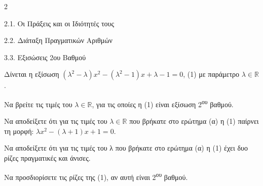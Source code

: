 \begin{ylh}{2}
    \item 2.1. Οι Πράξεις και οι Ιδιότητές τους
    \item 2.2. Διάταξη Πραγματικών Αριθμών
    \item 3.3. Εξισώσεις 2ου Βαθμού
\end{ylh}
Δίνεται η εξίσωση $(\lambda^2 - \lambda)x^2 - (\lambda^2 - 1)x + \lambda - 1 = 0$, (1) με παράμετρο $\lambda \in \mathbb{R}$.

\begin{alist}
\item Να βρείτε τις τιμές του $\lambda \in \mathbb{R}$, για τις οποίες η (1) είναι εξίσωση 2\textsuperscript{ου} βαθμού.
\item Να αποδείξετε ότι για τις τιμές του $\lambda \in \mathbb{R}$ που βρήκατε στο ερώτημα (α) η (1) παίρνει τη μορφή: $\lambda x^2 - (\lambda + 1)x + 1 = 0$.
\item Να αποδείξετε ότι για τις τιμές του λ που βρήκατε στο ερώτημα (α) η (1) έχει δυο ρίζες πραγματικές και άνισες.
\item Να προσδιορίσετε τις ρίζες της (1), αν αυτή είναι 2\textsuperscript{ου} βαθμού.

\end{alist}

